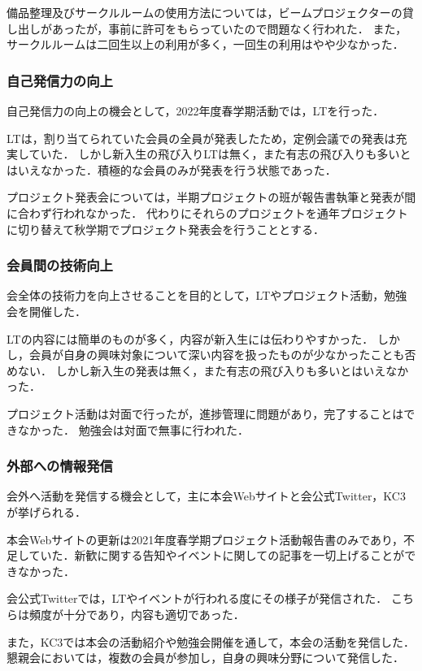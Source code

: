 備品整理及びサークルルームの使用方法については，ビームプロジェクターの貸し出しがあったが，事前に許可をもらっていたので問題なく行われた．
また，サークルルームは二回生以上の利用が多く，一回生の利用はやや少なかった．

\subsubsection*{自己発信力の向上}
自己発信力の向上の機会として，2022年度春学期活動では，LTを行った．

LTは，割り当てられていた会員の全員が発表したため，定例会議での発表は充実していた．
しかし新入生の飛び入りLTは無く，また有志の飛び入りも多いとはいえなかった．積極的な会員のみが発表を行う状態であった．

プロジェクト発表会については，半期プロジェクトの班が報告書執筆と発表が間に合わず行われなかった．
代わりにそれらのプロジェクトを通年プロジェクトに切り替えて秋学期でプロジェクト発表会を行うこととする．

\subsubsection*{会員間の技術向上}
会全体の技術力を向上させることを目的として，LTやプロジェクト活動，勉強会を開催した．

LTの内容には簡単のものが多く，内容が新入生には伝わりやすかった．
しかし，会員が自身の興味対象について深い内容を扱ったものが少なかったことも否めない．
しかし新入生の発表は無く，また有志の飛び入りも多いとはいえなかった．

プロジェクト活動は対面で行ったが，進捗管理に問題があり，完了することはできなかった．
勉強会は対面で無事に行われた．

\subsubsection*{外部への情報発信}
会外へ活動を発信する機会として，主に本会Webサイトと会公式Twitter，KC3が挙げられる．

本会Webサイトの更新は2021年度春学期プロジェクト活動報告書のみであり，不足していた．新歓に関する告知やイベントに関しての記事を一切上げることができなかった．

会公式Twitterでは，LTやイベントが行われる度にその様子が発信された．
こちらは頻度が十分であり，内容も適切であった．

また，KC3では本会の活動紹介や勉強会開催を通して，本会の活動を発信した．
懇親会においては，複数の会員が参加し，自身の興味分野について発信した．

